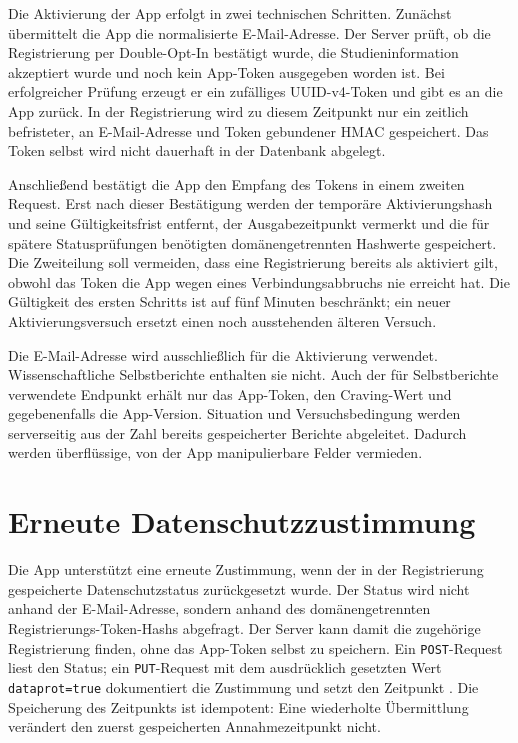 Die Aktivierung der App erfolgt in zwei technischen Schritten. Zunächst übermittelt die App die normalisierte E-Mail-Adresse. Der Server prüft, ob die Registrierung per Double-Opt-In bestätigt wurde, die Studieninformation akzeptiert wurde und noch kein App-Token ausgegeben worden ist. Bei erfolgreicher Prüfung erzeugt er ein zufälliges UUID-v4-Token und gibt es an die App zurück. In der Registrierung wird zu diesem Zeitpunkt nur ein zeitlich befristeter, an E-Mail-Adresse und Token gebundener HMAC gespeichert. Das Token selbst wird nicht dauerhaft in der Datenbank abgelegt.

Anschließend bestätigt die App den Empfang des Tokens in einem zweiten Request. Erst nach dieser Bestätigung werden der temporäre Aktivierungshash und seine Gültigkeitsfrist entfernt, der Ausgabezeitpunkt vermerkt und die für spätere Statusprüfungen benötigten domänengetrennten Hashwerte gespeichert. Die Zweiteilung soll vermeiden, dass eine Registrierung bereits als aktiviert gilt, obwohl das Token die App wegen eines Verbindungsabbruchs nie erreicht hat. Die Gültigkeit des ersten Schritts ist auf fünf Minuten beschränkt; ein neuer Aktivierungsversuch ersetzt einen noch ausstehenden älteren Versuch.

Die E-Mail-Adresse wird ausschließlich für die Aktivierung verwendet. Wissenschaftliche Selbstberichte enthalten sie nicht. Auch der für Selbstberichte verwendete Endpunkt erhält nur das App-Token, den Craving-Wert und gegebenenfalls die App-Version. Situation und Versuchsbedingung werden serverseitig aus der Zahl bereits gespeicherter Berichte abgeleitet. Dadurch werden überflüssige, von der App manipulierbare Felder vermieden.

\section{Erneute Datenschutzzustimmung}

Die App unterstützt eine erneute Zustimmung, wenn der in der Registrierung gespeicherte Datenschutzstatus zurückgesetzt wurde. Der Status wird nicht anhand der E-Mail-Adresse, sondern anhand des domänengetrennten Registrierungs-Token-Hashs abgefragt. Der Server kann damit die zugehörige Registrierung finden, ohne das App-Token selbst zu speichern. Ein \texttt{POST}-Request liest den Status; ein \texttt{PUT}-Request mit dem ausdrücklich gesetzten Wert \texttt{dataprot=true} dokumentiert die Zustimmung und setzt den Zeitpunkt . Die Speicherung des Zeitpunkts ist idempotent: Eine wiederholte Übermittlung verändert den zuerst gespeicherten Annahmezeitpunkt nicht.

